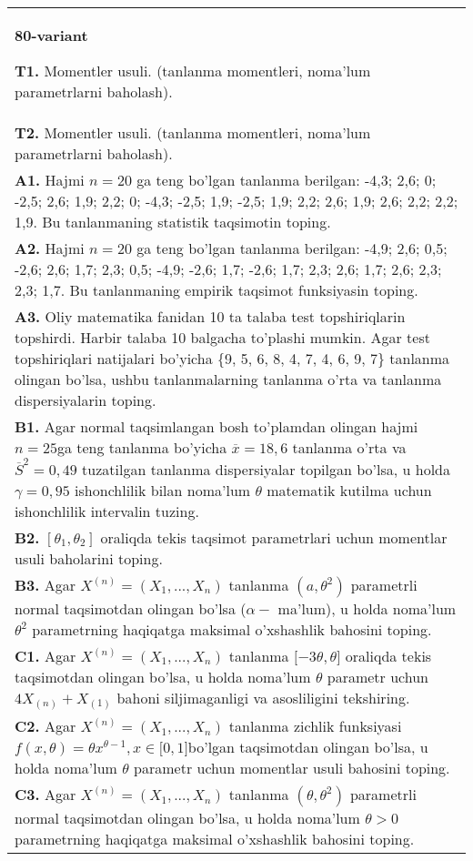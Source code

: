 \documentclass{article}
\begin{document}
\begin{tabular}{m{17cm}}
\textbf{80-variant}
\newline

\textbf{T1.} 
Momentler usuli. (tanlanma momentleri, noma'lum parametrlarni baholash).
\\
\textbf{T2.} 
Momentler usuli. (tanlanma momentleri, noma'lum parametrlarni baholash).
\\
\textbf{A1.} 
Hajmi \(n = 20\) ga teng bo'lgan tanlanma berilgan: -4,3; 2,6; 0; -2,5; 2,6; 1,9; 2,2; 0; -4,3; -2,5; 1,9; -2,5; 1,9; 2,2; 2,6; 1,9; 2,6; 2,2; 2,2; 1,9. Bu tanlanmaning statistik taqsimotin toping.
\\
\textbf{A2.} 
Hajmi \(n = 20\) ga teng bo'lgan tanlanma berilgan: -4,9; 2,6; 0,5; -2,6; 2,6; 1,7; 2,3; 0,5; -4,9; -2,6; 1,7; -2,6; 1,7; 2,3; 2,6; 1,7; 2,6; 2,3; 2,3; 1,7. Bu tanlanmaning empirik taqsimot funksiyasin toping.
\\
\textbf{A3.} 
Oliy matematika fanidan 10 ta talaba test topshiriqlarin topshirdi. Harbir talaba 10 balgacha to'plashi mumkin. Agar test topshiriqlari natijalari bo'yicha \{9, 5, 6, 8, 4, 7, 4, 6, 9, 7\} tanlanma olingan bo'lsa, ushbu tanlanmalarning tanlanma o'rta va tanlanma dispersiyalarin toping.
\\
\textbf{B1.} 
Agar normal taqsimlangan bosh to'plamdan olingan hajmi \(n = 25\)ga teng tanlanma bo'yicha \(\overline{x} = 18,6\) tanlanma o'rta va \({\overline{S}}^{2} = 0,49\) tuzatilgan tanlanma dispersiyalar topilgan bo'lsa, u holda \(\gamma = 0,95\) ishonchlilik bilan noma'lum \(\theta\) matematik kutilma uchun ishonchlilik intervalin tuzing.
\\
\textbf{B2.} 
\(\left\lbrack \theta_{1},\theta_{2} \right\rbrack\) oraliqda tekis taqsimot parametrlari uchun momentlar usuli baholarini toping.
\\
\textbf{B3.} 
Agar \(X^{(n)} = \left( X_{1},...,X_{n} \right)\) tanlanma \(\left( a,\theta^{2} \right)\) parametrli normal taqsimotdan olingan bo'lsa (\(\alpha -\) ma'lum), u holda noma'lum \(\theta^{2}\) parametrning haqiqatga maksimal o'xshashlik bahosini toping.
\\
\textbf{C1.} 
Agar \(X^{(n)} = \left( X_{1},...,X_{n} \right)\) tanlanma \(\lbrack - 3\theta,\theta\rbrack\) oraliqda tekis taqsimotdan olingan bo'lsa, u holda noma'lum \(\theta\) parametr uchun \(4X_{(n)} + X_{(1)}\) bahoni siljimaganligi va asosliligini tekshiring.
\\
\textbf{C2.} 
Agar \(X^{(n)} = \left( X_{1},...,X_{n} \right)\) tanlanma zichlik funksiyasi\(f(x,\theta) = \theta x^{\theta - 1},x \in \lbrack 0,1\rbrack\)bo'lgan taqsimotdan olingan bo'lsa, u holda noma'lum \(\theta\) parametr uchun momentlar usuli bahosini toping.
\\
\textbf{C3.} 
Agar \(X^{(n)} = \left( X_{1},...,X_{n} \right)\) tanlanma \(\left( \theta,\theta^{2} \right)\) parametrli normal taqsimotdan olingan bo'lsa, u holda noma'lum \(\theta > 0\) parametrning haqiqatga maksimal o'xshashlik bahosini toping.
\\

\end{tabular}
\vspace{1cm}
\end{document}
